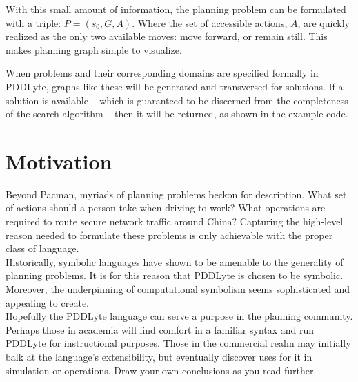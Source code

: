\documentclass[
a4paper, %
11pt, %
onecolumn, %
openany, %
]{memoir}
\begin{document}
{With this small amount of information, the planning problem can be formulated with a triple: $P = (s_0, G, A)$. Where the set of accessible actions, $A$, are quickly realized as the only two available moves: move forward, or remain still. This makes planning graph simple to visualize.\\

\begin{center}
\end{center}

When problems and their corresponding domains are specified formally in PDDLyte, graphs like these will be generated and transversed for solutions. If a solution is available -- which is guaranteed to be discerned from the completeness of the search algorithm -- then it will be returned, as shown in the example code.\\





\section{Motivation}
Beyond Pacman, myriads of planning problems beckon for description. What set of actions should a person take when driving to work? What operations are required to route secure network traffic around China? Capturing the high-level reason needed to formulate these problems is only achievable with the proper class of language.\\

Historically, symbolic languages have shown to be amenable to the generality of planning problems. It is for this reason that PDDLyte is chosen to be symbolic. Moreover, the underpinning of computational symbolism seems sophisticated and appealing to create.\\

Hopefully the PDDLyte language can serve a purpose in the planning community. Perhaps those in academia will find comfort in a familiar syntax and run PDDLyte for instructional purposes. Those in the commercial realm may initially balk at the language's extensibility, but eventually discover uses for it in simulation or operations. Draw your own conclusions as you read further. 

}
\end{document}

